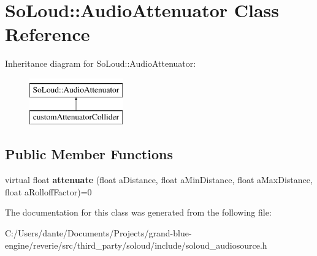 \hypertarget{class_so_loud_1_1_audio_attenuator}{}\section{So\+Loud\+::Audio\+Attenuator Class Reference}
\label{class_so_loud_1_1_audio_attenuator}
Inheritance diagram for So\+Loud\+::Audio\+Attenuator\+:\begin{figure}[H]
\begin{center}
\leavevmode
\includegraphics[height=2.000000cm]{class_so_loud_1_1_audio_attenuator}
\end{center}
\end{figure}
\subsection*{Public Member Functions}
\begin{DoxyCompactItemize}
\item 
\mbox{\label{class_so_loud_1_1_audio_attenuator_ac711201fd128b55f4870a0d887071829}} 
virtual float {\bfseries attenuate} (float a\+Distance, float a\+Min\+Distance, float a\+Max\+Distance, float a\+Rolloff\+Factor)=0
\end{DoxyCompactItemize}


The documentation for this class was generated from the following file\+:\begin{DoxyCompactItemize}
\item 
C\+:/\+Users/dante/\+Documents/\+Projects/grand-\/blue-\/engine/reverie/src/third\+\_\+party/soloud/include/soloud\+\_\+audiosource.\+h\end{DoxyCompactItemize}
